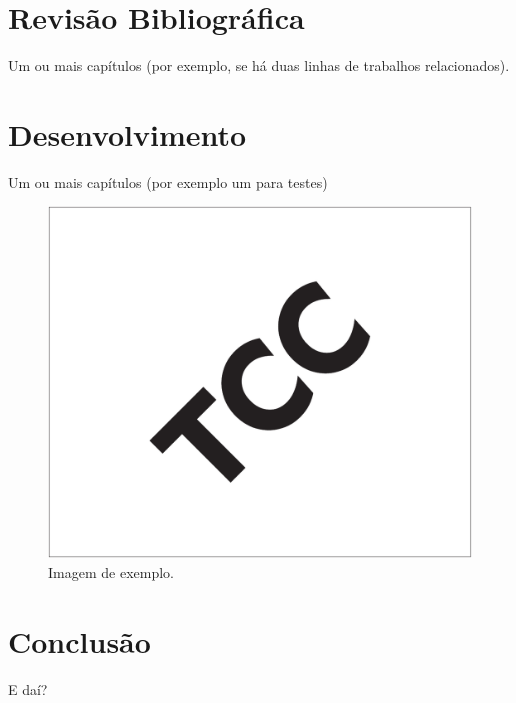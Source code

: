 \documentclass[12pt, %
openright, 
oneside, %
a4paper,    %
brazil]{facom-ufu-abntex2}
\begin{document}
\chapter{Revisão Bibliográfica}
Um ou mais capítulos (por exemplo, se há duas linhas de trabalhos relacionados).



\chapter{Desenvolvimento}
Um ou mais capítulos (por exemplo um para testes)


\begin{figure}[!ht]
    \centering
	\includegraphics[width=0.55\linewidth]{imagemExemplo.pdf}
	\caption[Isso é o que aparece no sumário]{Imagem de exemplo.}
	\label{fig:graficosVariandoTamanhoRede}
\end{figure}



\chapter[Conclusão]{Conclusão}
E daí?





\postextual





\end{document}
